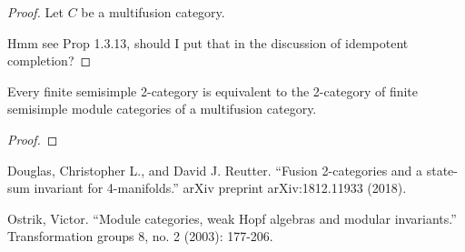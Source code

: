 \documentclass[12pt]{article}
\begin{document}
\begin{proof}
Let $C$ be a multifusion category.

Hmm see Prop 1.3.13, should I put that in the discussion
of idempotent completion?
\end{proof}


\begin{theorem}
Every finite semisimple 2-category is equivalent to
the 2-category of finite semisimple module categories
of a multifusion category.
\end{theorem}

\begin{proof}
\end{proof}


\begin{thebibliography}{1}

 Douglas, Christopher L., and David J. Reutter. ``Fusion
2-categories and a state-sum invariant for 4-manifolds.'' arXiv preprint arXiv:1812.11933 (2018).

 Ostrik, Victor. ``Module categories, weak Hopf algebras and
modular invariants.'' Transformation groups 8, no. 2 (2003): 177-206.

\end{thebibliography}
\end{document}
